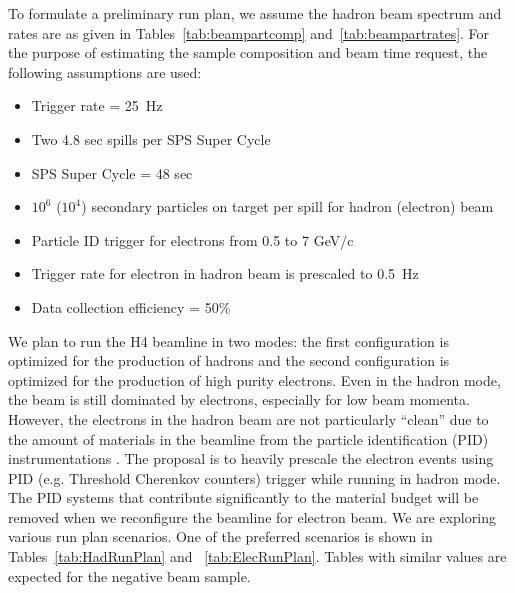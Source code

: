 To formulate a preliminary run plan, we assume the hadron beam spectrum and rates are as given in Tables~\ref{tab:beampartcomp} and~\ref{tab:beampartrates}.   For the purpose of estimating the sample composition and beam time request, the following assumptions are used:
\begin{itemize}
\item { Trigger rate = 25~Hz}
\item { Two 4.8 sec spills per SPS Super Cycle }
\item { SPS Super Cycle = 48 sec}
\item { $10^6$ ($10^4$) secondary particles on target per spill for hadron (electron) beam}
\item { Particle ID trigger for electrons from 0.5 to 7 GeV/c}
\item { Trigger rate for electron in hadron beam is prescaled to 0.5~Hz}
\item { Data collection efficiency = 50\%}
\end{itemize}
We plan to run the H4 beamline in two modes: the first configuration is optimized for the production of hadrons and the second configuration is optimized for the production of high purity electrons. Even in the hadron mode, the beam is still dominated by electrons, especially for low beam momenta. However, the electrons in the hadron beam are not particularly ``clean'' due to the amount of materials in the beamline from the particle identification (PID) instrumentations .  The proposal is to heavily prescale the electron events using PID (e.g. Threshold Cherenkov counters) trigger while running in hadron mode. The PID systems that contribute significantly to the material budget will be removed when we reconfigure the beamline for electron beam.  We are exploring various run plan scenarios. One of the preferred scenarios is shown in Tables~\ref{tab:HadRunPlan} and ~\ref{tab:ElecRunPlan}. Tables with similar values are expected for the negative beam sample. 
